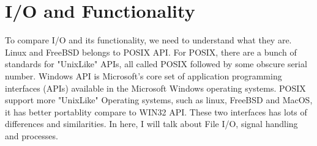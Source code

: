 \documentclass[10pt,draftclsnofoot,onecolumn,journal,compsoc]{IEEEtran}
\begin{document}
\section{I/O and Functionality}
To compare I/O and its functionality, we need to understand what they are. Linux and FreeBSD belongs to POSIX API. For POSIX, there are a bunch of standards for "UnixLike" APIs, all called POSIX followed by some obscure serial number. Windows API is Microsoft's core set of application programming interfaces (APIs) available in the Microsoft Windows operating systems. POSIX support more "UnixLike" Operating systems, such as linux, FreeBSD and MacOS, it has better portablity compare to WIN32 API. These two interfaces has lots of differences and similarities. In here, I will talk about File I/O, signal handling and processes.\cite{Love} \par
\end{document}
